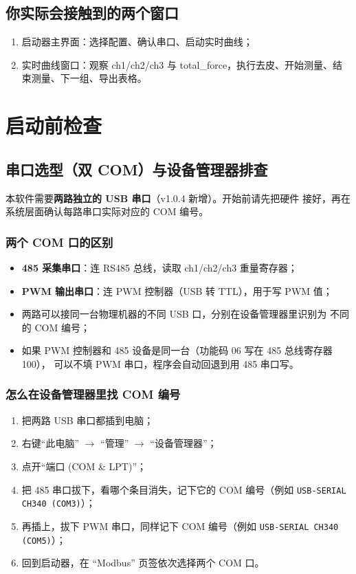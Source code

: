 \documentclass[11pt,a4paper]{ctexart}
\begin{document}
\subsection{你实际会接触到的两个窗口}

\begin{enumerate}[leftmargin=2em]
  \item 启动器主界面：选择配置、确认串口、启动实时曲线；
  \item 实时曲线窗口：观察 ch1/ch2/ch3 与 total\_force，执行去皮、开始测量、结束测量、下一组、导出表格。
\end{enumerate}

\section{启动前检查}

\subsection{串口选型（双 COM）与设备管理器排查}

本软件需要\textbf{两路独立的 USB 串口}（v1.0.4 新增）。开始前请先把硬件
接好，再在系统层面确认每路串口实际对应的 COM 编号。

\subsubsection{两个 COM 口的区别}

\begin{itemize}[leftmargin=2em]
  \item \textbf{485 采集串口}：连 RS485 总线，读取 ch1/ch2/ch3 重量寄存器；
  \item \textbf{PWM 输出串口}：连 PWM 控制器（USB 转 TTL），用于写 PWM 值；
  \item 两路可以接同一台物理机器的不同 USB 口，分别在设备管理器里识别为
        不同的 COM 编号；
  \item 如果 PWM 控制器和 485 设备是同一台（功能码 06 写在 485 总线寄存器 100），
        可以不填 PWM 串口，程序会自动回退到用 485 串口写。
\end{itemize}

\subsubsection{怎么在设备管理器里找 COM 编号}

\begin{enumerate}[leftmargin=2em]
  \item 把两路 USB 串口都插到电脑；
  \item 右键“此电脑” $\rightarrow$ “管理” $\rightarrow$ “设备管理器”；
  \item 点开“端口 (COM \& LPT)”；
  \item 把 485 串口拔下，看哪个条目消失，记下它的 COM 编号（例如
        \texttt{USB-SERIAL CH340 (COM3)}）；
  \item 再插上，拔下 PWM 串口，同样记下 COM 编号（例如
        \texttt{USB-SERIAL CH340 (COM5)}）；
  \item 回到启动器，在 “Modbus” 页签依次选择两个 COM 口。
\end{enumerate}
\end{document}
